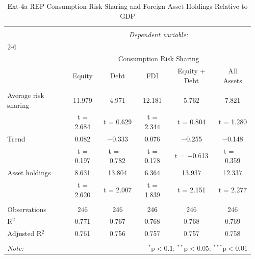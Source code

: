 
\begin{table}[!htbp] \centering 
  \caption{Ext-4a REP Consumption Risk Sharing and Foreign Asset Holdings Relative to GDP} 
  \label{} 
\begin{tabular}{@{\extracolsep{5pt}}lccccc} 
\\[-1.8ex]\hline 
\hline \\[-1.8ex] 
 & \multicolumn{5}{c}{\textit{Dependent variable:}} \\ 
\cline{2-6} 
\\[-1.8ex] & \multicolumn{5}{c}{Consumption Risk Sharing} \\ 
 & Equity & Debt & FDI & Equity + Debt & All Assets \\ 
\hline \\[-1.8ex] 
 Average risk sharing & 11.979 & 4.971 & 12.181 & 5.762 & 7.821 \\ 
  & t = 2.684 & t = 0.629 & t = 2.344 & t = 0.804 & t = 1.280 \\ 
  Trend & 0.082 & $-$0.333 & 0.076 & $-$0.255 & $-$0.148 \\ 
  & t = 0.197 & t = $-$0.782 & t = 0.178 & t = $-$0.613 & t = $-$0.359 \\ 
  Asset holdings & 8.631 & 13.804 & 6.364 & 13.937 & 12.337 \\ 
  & t = 2.620 & t = 2.007 & t = 1.839 & t = 2.151 & t = 2.277 \\ 
 \hline \\[-1.8ex] 
Observations & 246 & 246 & 246 & 246 & 246 \\ 
R$^{2}$ & 0.771 & 0.767 & 0.768 & 0.768 & 0.769 \\ 
Adjusted R$^{2}$ & 0.761 & 0.756 & 0.757 & 0.757 & 0.758 \\ 
\hline 
\hline \\[-1.8ex] 
\textit{Note:}  & \multicolumn{5}{r}{$^{*}$p$<$0.1; $^{**}$p$<$0.05; $^{***}$p$<$0.01} \\ 
\end{tabular} 
\end{table} 
